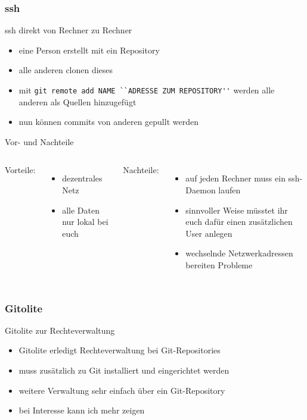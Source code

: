 \documentclass{beamer}
\begin{document}
\subsubsection{ssh}
\begin{frame}[fragile]{ssh direkt von Rechner zu Rechner}
	\begin{itemize}
		\item eine Person erstellt mit ein Repository
		\item alle anderen clonen dieses
		\item mit \verb|git remote add NAME ``ADRESSE ZUM REPOSITORY''| werden alle anderen als Quellen hinzugefügt
		\item nun können commits von anderen gepullt werden
	\end{itemize}
\end{frame}

\begin{frame}{Vor- und Nachteile}
	\begin{columns}[c]
		Vorteile:
		\begin{itemize}
			\item dezentrales Netz
			\item alle Daten nur lokal bei euch
		\end{itemize}
		Nachteile:
		\begin{itemize}
			\item auf jeden Rechner muss ein ssh-Daemon laufen
			\item sinnvoller Weise müsstet ihr euch dafür einen zusätzlichen User anlegen
			\item wechselnde Netzwerkadressen bereiten Probleme
		\end{itemize}
	\end{columns}
\end{frame}

\subsubsection{Gitolite}
\begin{frame}[fragile]{Gitolite zur Rechteverwaltung}
	\begin{itemize}
		\item Gitolite erledigt Rechteverwaltung bei Git-Repositories
		\item muss zusätzlich zu Git installiert und eingerichtet werden
		\item weitere Verwaltung sehr einfach über ein Git-Repository
		\item bei Interesse kann ich mehr zeigen
	\end{itemize}
\end{frame}
\end{document}
